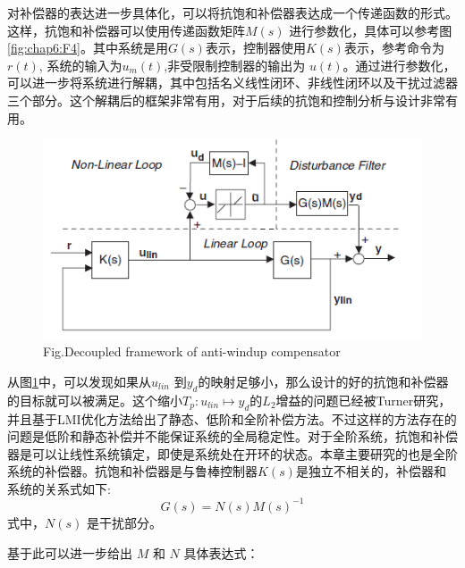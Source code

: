 对补偿器的表达进一步具体化，可以将抗饱和补偿器表达成一个传递函数的形式。这样，抗饱和补偿器可以使用传递函数矩阵$M(s)$ 进行参数化，具体可以参考图\ref{fig:chap6:F4}。其中系统是用$G(s)$表示，控制器使用$K(s)$表示，参考命令为$r(t)$, 系统的输入为$u_m(t)$,非受限制控制器的输出为 $u(t)$。通过进行参数化，可以进一步将系统进行解耦，其中包括名义线性闭环、非线性闭环以及干扰过滤器三个部分。这个解耦后的框架非常有用，对于后续的抗饱和控制分析与设计非常有用。
\begin{figure}[!htp]
\centering
 \includegraphics[width=14cm]{figure/chap6/decoupAW.png}
 \label{fig:chap6:F5}
  {Fig.}{Decoupled framework of anti-windup compensator}
\end{figure}

从图\ref{fig:chap6:F5}中，可以发现如果从$u_{lin}$ 到$y_d$的映射足够小，那么设计的好的抗饱和补偿器的目标就可以被满足。这个缩小$T_p:u_{lin}\mapsto y_d$的$L_2$增益的问题已经被Turner研究，并且基于LMI优化方法给出了静态、低阶和全阶补偿方法\cite{sofrony2010anti,galeani2009tutorial}。不过这样的方法存在的问题是低阶和静态补偿并不能保证系统的全局稳定性。对于全阶系统，抗饱和补偿器是可以让线性系统镇定，即使是系统处在开环的状态。本章主要研究的也是全阶系统的补偿器。抗饱和补偿器是与鲁棒控制器$K(s)$是独立不相关的，补偿器和系统的关系式如下:
\begin{equation}
\label{eq:chap6:awNs}
G(s) = N(s)M(s)^{-1}
\end{equation}
式中，$N(s)$ 是干扰部分。

基于此可以进一步给出 $M$ 和 $N$ 具体表达式：

